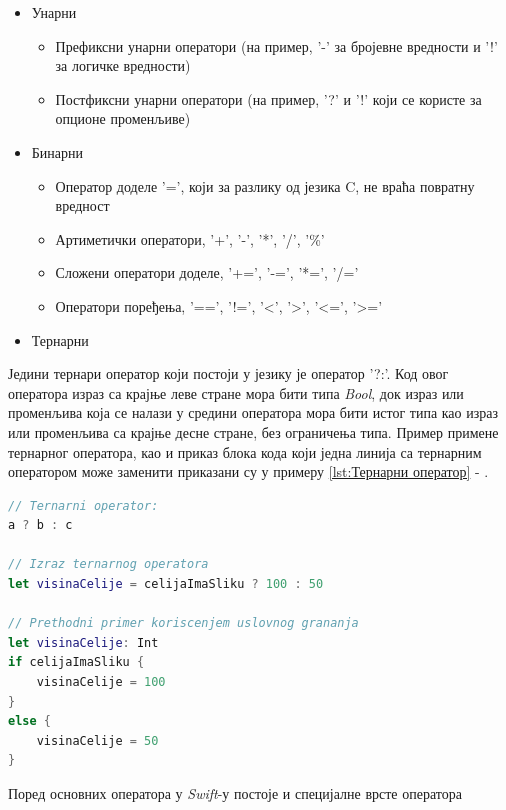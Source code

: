 \documentclass[12pt,oneside]{memoir}
\begin{document}
\begin{itemize}
  \item Унарни
  
\begin{itemize}
    \item Префиксни унарни оператори (на пример, '-' за бројевне вредности и '!' за логичке вредности)  
    \item Постфиксни унарни оператори (на пример, '?' и '!' који се користе за опционе променљиве)
\end{itemize}
  
  \item Бинарни 
  
\begin{itemize}
    \item Оператор доделе '=', који за разлику од језика C, не враћа повратну вредност  
    \item Артиметички оператори, '+', '-', '*', '/', '\%'
    \item Сложени оператори доделе, '+=', '-=', '*=', '/='
    \item Оператори поређења, '==', '!=', '<', '>', '<=', '>='
\end{itemize}
 
  \item Тернарни
\end{itemize}

  \indent Једини тернари оператор који постоји у језику је оператор '?:'. Код овог оператора израз са крајње леве стране мора бити типа \textit{Bool}, док израз или променљива која се налази у средини оператора мора бити истог типа као израз или променљива са крајње десне стране, без ограничења типа. Пример примене тернарног оператора, као и приказ блока кода који једна линија са тернарним оператором може заменити приказани су у примеру \ref{lst:Тернарни оператор} - .
  
\begin{lstlisting}[caption=\textit{{Тернарни оператор}}, label={lst:Тернарни оператор}, language=Swift, frame=single]
// Ternarni operator:
a ? b : c

// Izraz ternarnog operatora 
let visinaCelije = celijaImaSliku ? 100 : 50

// Prethodni primer koriscenjem uslovnog grananja
let visinaCelije: Int
if celijaImaSliku {
    visinaCelije = 100
}
else {
    visinaCelije = 50
}
\end{lstlisting}

\indent Поред основних оператора у \textit{Swift}-у постоје и специјалне врсте оператора
\end{document}
